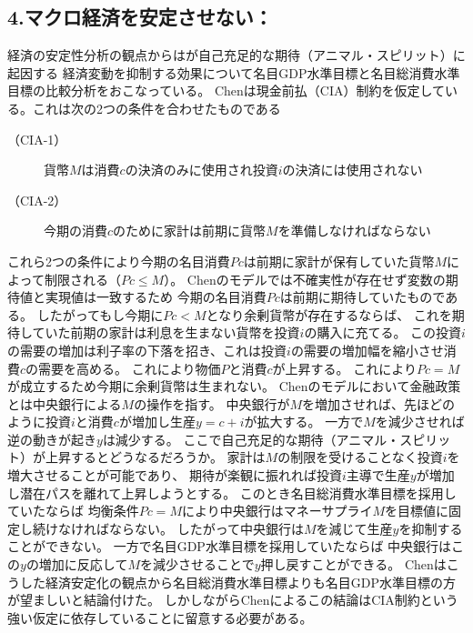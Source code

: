 \subsection{4.マクロ経済を安定させない：\textcite{Chen2019}}
\label{sec:chapter2_review_chen_2019}
経済の安定性分析の観点からは\textcite{Chen2019}が自己充足的な期待（アニマル・スピリット）に起因する
経済変動を抑制する効果について名目GDP水準目標と名目総消費水準目標の比較分析をおこなっている。
Chenは現金前払（CIA）制約を仮定している。これは次の2つの条件を合わせたものである
\begin{description}
  \item[（CIA-1）]貨幣\(M\)は消費\(c\)の決済のみに使用され投資\(i\)の決済には使用されない
  \item[（CIA-2）]今期の消費\(c\)のために家計は前期に貨幣\(M\)を準備しなければならない
\end{description}
これら2つの条件により今期の名目消費\(Pc\)は前期に家計が保有していた貨幣\(M\)によって制限される（\(Pc\le M\)）。
Chenのモデルでは不確実性が存在せず変数の期待値と実現値は一致するため
今期の名目消費\(Pc\)は前期に期待していたものである。
したがってもし今期に\(Pc<M\)となり余剰貨幣が存在するならば、
これを期待していた前期の家計は利息を生まない貨幣を投資\(i\)の購入に充てる。
この投資\(i\)の需要の増加は利子率の下落を招き、これは投資\(i\)の需要の増加幅を縮小させ消費\(c\)の需要を高める。
これにより物価\(P\)と消費\(c\)が上昇する。
これにより\(Pc=M\)が成立するため今期に余剰貨幣は生まれない。
Chenのモデルにおいて金融政策とは中央銀行による\(M\)の操作を指す。
中央銀行が\(M\)を増加させれば、先ほどのように投資\(i\)と消費\(c\)が増加し生産\(y=c+i\)が拡大する。
一方で\(M\)を減少させれば逆の動きが起き\(y\)は減少する。
ここで自己充足的な期待（アニマル・スピリット）が上昇するとどうなるだろうか。
家計は\(M\)の制限を受けることなく投資\(i\)を増大させることが可能であり、
期待が楽観に振れれば投資\(i\)主導で生産\(y\)が増加し潜在パスを離れて上昇しようとする。
このとき名目総消費水準目標を採用していたならば
均衡条件\(Pc=M\)により中央銀行はマネーサプライ\(M\)を目標値に固定し続けなければならない。
したがって中央銀行は\(M\)を減じて生産\(y\)を抑制することができない。
一方で名目GDP水準目標を採用していたならば
中央銀行はこの\(y\)の増加に反応して\(M\)を減少させることで\(y\)押し戻すことができる。
Chenはこうした経済安定化の観点から名目総消費水準目標よりも名目GDP水準目標の方が望ましいと結論付けた。
しかしながらChenによるこの結論はCIA制約という強い仮定に依存していることに留意する必要がある。

